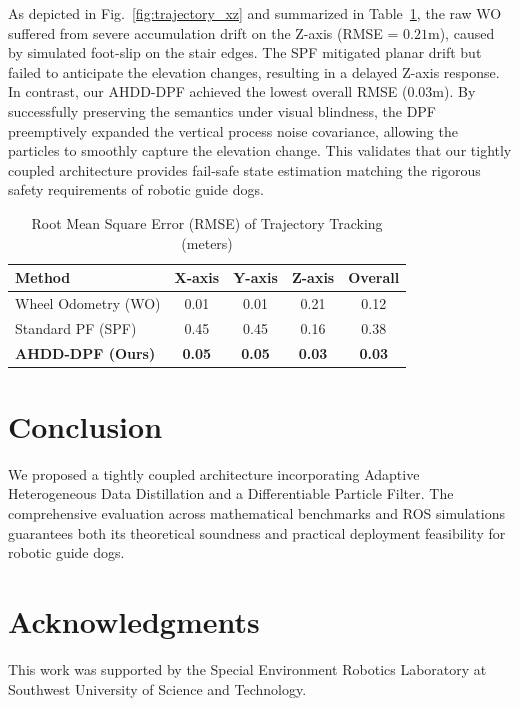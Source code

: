 \documentclass[final,3p,times]{elsarticle}
\begin{document}
As depicted in Fig.~\ref{fig:trajectory_xz} and summarized in Table~\ref{tab:rmse_comparison}, the raw WO suffered from severe accumulation drift on the Z-axis (RMSE = $0.21$m), caused by simulated foot-slip on the stair edges. The SPF mitigated planar drift but failed to anticipate the elevation changes, resulting in a delayed Z-axis response. In contrast, our AHDD-DPF achieved the lowest overall RMSE ($0.03$m). By successfully preserving the semantics under visual blindness, the DPF preemptively expanded the vertical process noise covariance, allowing the particles to smoothly capture the elevation change. This validates that our tightly coupled architecture provides fail-safe state estimation matching the rigorous safety requirements of robotic guide dogs.

\begin{table}[htbp]
    \centering
    \caption{Root Mean Square Error (RMSE) of Trajectory Tracking (meters)}
    \label{tab:rmse_comparison}
    \begin{tabular}{lcccc}
        \toprule
        \textbf{Method} & \textbf{X-axis} & \textbf{Y-axis} & \textbf{Z-axis} & \textbf{Overall} \\
        \midrule
        Wheel Odometry (WO) & 0.01 & 0.01 & 0.21 & 0.12 \\
        Standard PF (SPF) & 0.45 & 0.45 & 0.16 & 0.38 \\
        \textbf{AHDD-DPF (Ours)} & \textbf{0.05} & \textbf{0.05} & \textbf{0.03} & \textbf{0.03} \\
        \bottomrule
    \end{tabular}
\end{table}

\section{Conclusion}
\label{sec:conclusion}
We proposed a tightly coupled architecture incorporating Adaptive Heterogeneous Data Distillation and a Differentiable Particle Filter. The comprehensive evaluation across mathematical benchmarks and ROS simulations guarantees both its theoretical soundness and practical deployment feasibility for robotic guide dogs.

\section*{Acknowledgments}
This work was supported by the Special Environment Robotics Laboratory at Southwest University of Science and Technology.



\end{document}
